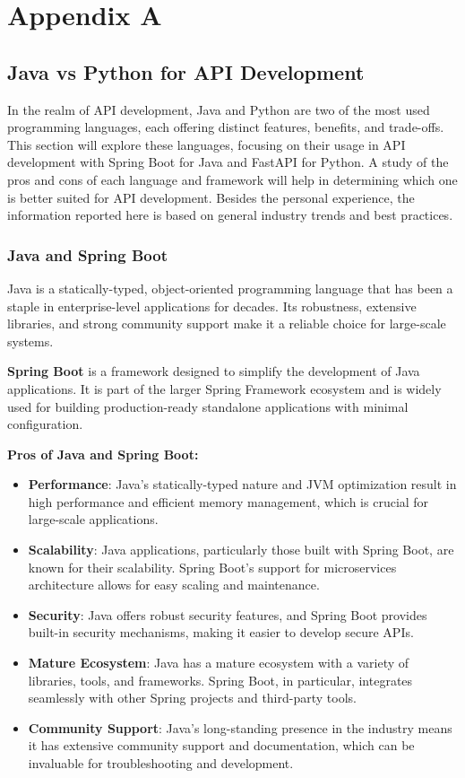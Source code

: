 \chapter{Appendix A}
\section{Java vs Python for API Development}
\label{sec:java-vs-python}

In the realm of API development, Java and Python are two of the most used programming languages, each offering distinct features, benefits, and trade-offs. This section will explore these languages, focusing on their usage in API development with Spring Boot for Java and FastAPI for Python.
A study of the pros and cons of each language and framework will help in determining which one is better suited for API development. Besides the personal experience, the information reported here is based on general industry trends and best practices.

\subsection{Java and Spring Boot}

Java is a statically-typed, object-oriented programming language that has been a staple in enterprise-level applications for decades. Its robustness, extensive libraries, and strong community support make it a reliable choice for large-scale systems.

\textbf{Spring Boot} is a framework designed to simplify the development of Java applications. It is part of the larger Spring Framework ecosystem and is widely used for building production-ready standalone applications with minimal configuration.

\textbf{Pros of Java and Spring Boot:}
\begin{itemize}
    \item \textbf{Performance}: Java's statically-typed nature and JVM optimization result in high performance and efficient memory management, which is crucial for large-scale applications.
    \item \textbf{Scalability}: Java applications, particularly those built with Spring Boot, are known for their scalability. Spring Boot's support for microservices architecture allows for easy scaling and maintenance.
    \item \textbf{Security}: Java offers robust security features, and Spring Boot provides built-in security mechanisms, making it easier to develop secure APIs.
    \item \textbf{Mature Ecosystem}: Java has a mature ecosystem with a variety of libraries, tools, and frameworks. Spring Boot, in particular, integrates seamlessly with other Spring projects and third-party tools.
    \item \textbf{Community Support}: Java's long-standing presence in the industry means it has extensive community support and documentation, which can be invaluable for troubleshooting and development.
\end{itemize}

